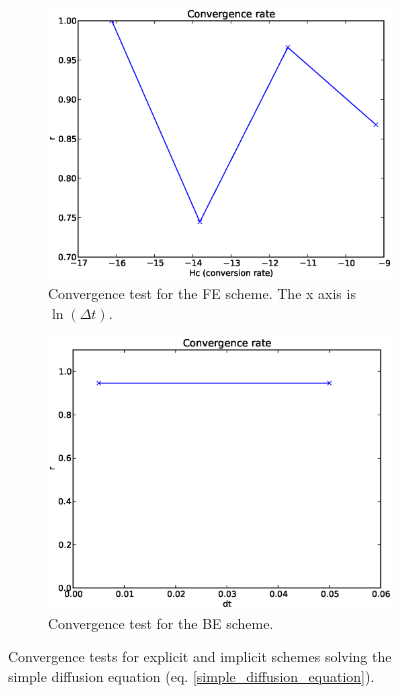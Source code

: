 \begin{figure}[H]
 \centering
 \begin{subfigure}[t]{0.48\textwidth}
 \includegraphics[width=\textwidth]{../doc/results/experiment_27112013_1017/results/ConvergenceTest.eps}
 \caption{Convergence test for the FE scheme. The x axis is $\ln(\Delta t)$.}
 \label{convergence_test:FE}
\end{subfigure}
\begin{subfigure}[t]{0.48\textwidth}
 \includegraphics[width=\textwidth]{../doc/results/experiment_18042014_1450_convergencetest_BE2D/results/ConvergenceTest.eps}
 \caption{Convergence test for the BE scheme.}
 \label{convergence_test:BE}
\end{subfigure}
\caption[Convergence tests in 1D]{Convergence tests for explicit and implicit schemes solving the simple diffusion equation (eq. \eqref{simple_diffusion_equation}).}
\label{convergence_test}
\end{figure}

